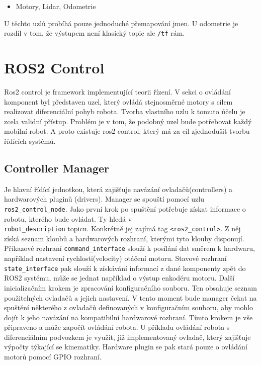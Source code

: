 \begin{itemize}[leftmargin=*]
	\item{Motory, Lidar, Odometrie}
\end{itemize}
\vspace*{-0.5em}
U těchto uzlů probíhá pouze jednoduché přemapování jmen. U odometrie je rozdíl v tom, že výstupem není klasický topic ale \verb|/tf| rám.


\section{ROS2 Control}
Ros2 control je framework implementující teorii řízení. V sekci o ovládání komponent byl představen uzel, který ovládá stejnosměrné motory s cílem realizovat diferenciální pohyb robota. Tvorba vlastního uzlu k tomuto účelu je zcela validní přístup. Problém je v tom, že podobný uzel bude potřebovat každý mobilní robot. A proto existuje ros2 control, který má za cíl zjednodušit tvorbu řídících systémů.

\subsection*{Controller Manager}
Je hlavní řídící jednotkou, která zajišťuje navázání ovladačů(controllers) a hardwarových pluginů (drivers). Manager se spouští pomocí uzlu \verb|ros2_control_node|. Jako první krok po spuštění potřebuje získat informace o robotu, kterého bude ovládat. Ty hledá v \\ \verb|robot_description| topicu. Konkrétně jej zajímá tag \verb|<ros2_control>|. Z něj získá seznam kloubů a hardwarových rozhraní, kterými tyto klouby disponují. Příkazové rozhraní \verb|command_interface| slouží k posílání dat směrem k hardwaru, například nastavení rychlosti(velocity) otáčení motoru. Stavové rozhraní \verb|state_interface| pak slouží k získávání informací z dané komponenty zpět do ROS2 systému, může se jednat například o výstup enkodéru motoru. Další inicializačním krokem je zpracování konfiguračního souboru. Ten obsahuje seznam použitelných ovladačů a jejich nastavení. V tento moment bude manager čekat na spuštění některého z ovladačů definovaných v konfiguračním souboru, aby mohlo dojít k jeho navázání na kompatibilní hardwarové rozhraní. Tímto krokem je vše připraveno a může započít ovládání robota.
U příkladu ovládání robota s diferenciálním podvozkem je využit, již implementovaný ovladač, který zajišťuje výpočty týkající se kinematiky. Hardware plugin se pak stará pouze o ovládání motorů pomocí GPIO rozhraní.

